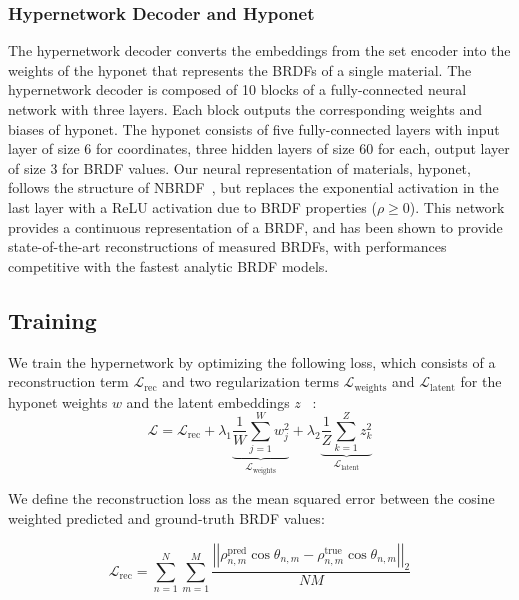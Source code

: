 \subsubsection{Hypernetwork Decoder and Hyponet} %
The hypernetwork decoder converts the embeddings from the set encoder into the weights of the hyponet that represents the BRDFs of a single material. The hypernetwork decoder is composed of 10 blocks of a fully-connected neural network with three layers. Each block outputs the corresponding weights and biases of hyponet. The hyponet consists of five fully-connected layers with input layer of size 6 for coordinates, three hidden layers of size 60 for each, output layer of size 3 for BRDF values. Our neural representation of materials, hyponet, follows the structure of NBRDF~\cite{sztrajman2021neural}, but replaces the exponential activation in the last layer with a ReLU activation due to BRDF properties ($\rho \ge 0$). This network provides a continuous representation of a BRDF, and has been shown to provide state-of-the-art reconstructions of measured BRDFs, with performances competitive with the fastest analytic BRDF models.


\subsection{Training}
\label{sec:traindet}


We train the hypernetwork by optimizing the following loss, which consists of a reconstruction term $\mathcal{L}_\text{rec}$ and two regularization terms $\mathcal{L}_\text{weights}$ and $\mathcal{L}_\text{latent}$ for the hyponet weights $w$ and the latent embeddings $z$ ~\cite{ha2017hypernetworks}:
\begin{equation}
    \mathcal{L} = \mathcal{L}_\text{rec} +
              \lambda_1 \underbrace{\frac{1}{W} \sum_{j=1}^W w^2_j}_{\mathcal{L}_\text{weights}} +
              \lambda_2 \underbrace{\frac{1}{Z} \sum_{k=1}^Z z^2_k}_{\mathcal{L}_\text{latent}}
    \label{eq:loss}
\end{equation}

We define the reconstruction loss as the mean squared error between the cosine weighted predicted and ground-truth BRDF values:

\begin{equation}
    \mathcal{L}_{\text{rec}} = \sum_{n=1}^{N}\sum_{m=1}^{M}\frac{\left|\left|\rho^{\text{pred}}_{n, m} \cos{\theta_{n, m}} - \rho^{\text{true}}_{n, m} \cos{\theta_{n, m}}\right|\right|_{2}}{NM}
    \label{eq:Lrec}
\end{equation}

